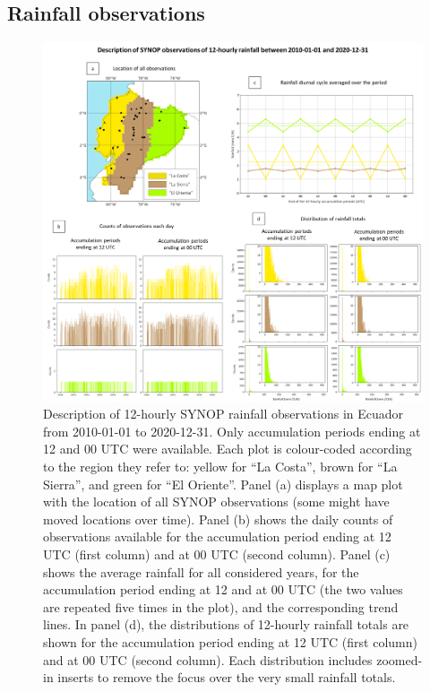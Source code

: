 \documentclass[techmemo]{ecmwfrep}%
\begin{document}
\subsection{Rainfall observations}
\label{sec:Data_RainOBS}

\begin{figure}
\centering
\includegraphics[width=\textwidth]{Figures/04_DATA_Description_SYNOP_rainfall.png}
\caption{Description of 12-hourly SYNOP rainfall observations in Ecuador from 2010-01-01 to 2020-12-31. Only accumulation periods ending at 12 and 00 UTC were available. Each plot is colour-coded according to the region they refer to: yellow for “La Costa”, brown for “La Sierra”, and green for “El Oriente”. Panel (a) displays a map plot with the location of all SYNOP observations (some might have moved locations over time). Panel (b) shows the daily counts of observations available for the accumulation period ending at 12 UTC (first column) and at 00 UTC (second column). Panel (c) shows the average rainfall for all considered years, for the accumulation period ending at 12 and at 00 UTC (the two values are repeated five times in the plot), and the corresponding trend lines. In panel (d), the distributions of 12-hourly rainfall totals are shown for the accumulation period ending at 12 UTC (first column) and at 00 UTC (second column). Each distribution includes zoomed-in inserts to remove the focus over the very small rainfall totals.}
\label{fig:Descriptio_SYNOP}
\end{figure}
\end{document}
